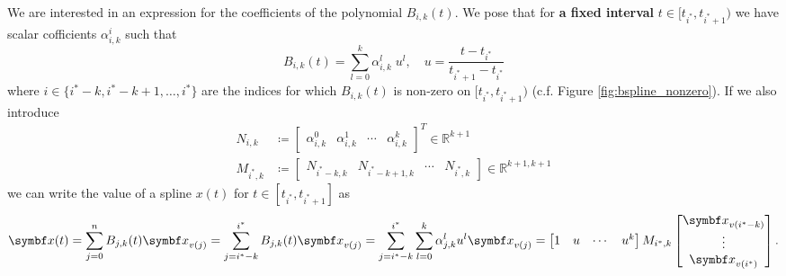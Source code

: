 We are interested in an expression for the coefficients of the polynomial $B_{i, k}(t)$. We pose that for \textbf{a fixed interval} $t \in [t_{i^*}, t_{i^*+1})$ we have scalar cofficients $\alpha^i_{i,k}$ such that
\begin{equation}
  \label{eq:basis_expression}
  B_{i, k}(t) = \sum_{l=0}^k \alpha^{l}_{i, k} \; u^l, \quad u = \frac{t - t_{i^*}}{t_{i^*+1} - t_{i^*}}
\end{equation}
where $i \in \{ i^* - k, i^* - k + 1, \ldots, i^* \}$ are the indices for which $B_{i, k}(t)$ is non-zero on $[t_{i^*}, t_{i^*+1})$ (c.f. Figure \ref{fig:bspline_nonzero}). If we also introduce
\begin{equation}
  \label{eq:coeff_matrix_forms}
  \begin{aligned}
    N_{i, k}   & \coloneq \begin{bmatrix} \alpha_{i,k}^0 & \alpha_{i, k}^1 & \cdots & \alpha_{i, k}^k \end{bmatrix}^T \in \mathbb{R}^{k+1}    \\
    M_{i^*, k} & \coloneq \begin{bmatrix}
      N_{i^*-k, k} & N_{i^*-k+1, k} & \cdots & N_{i^*, k}
    \end{bmatrix} \in \mathbb{R}^{k+1, k+1}
  \end{aligned}
\end{equation}
we can write the value of a spline $x(t)$ for $t \in [t_{i^*}, t_{i^*+1}]$ as
\begin{equation}
  \begin{aligned}
    \x(t) = \sum_{j = 0}^n B_{j,k}(t) \x_{v(j)} = \sum_{j = i^*-k}^{i^*} B_{j,k}(t) \x_{v(j)} = \sum_{j = i^*-k}^{i^*} \sum_{l=0}^k \alpha_{j, k}^l u^l \x_{v(j)} =  \begin{bmatrix} 1 & u & \cdots & u^k \end{bmatrix} M_{i^*, k} \begin{bmatrix} \x_{v(i^* - k)} \\ \vdots \\ \x_{v(i^*)} \end{bmatrix}.
  \end{aligned}
\end{equation}

